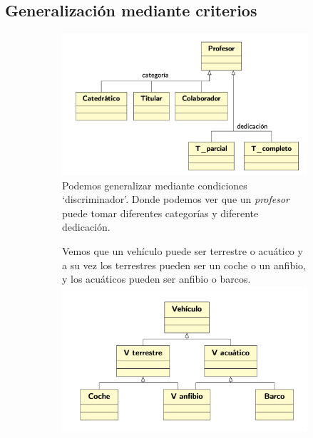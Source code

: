 \subsection{Generalización mediante criterios}
\begin{figure}[h]
	\begin{center}
		\begin{subfigure}[b]{0.45\textwidth} %
			\includegraphics[width=\textwidth]{Imagenes/gen2.png} %
			Podemos generalizar mediante condiciones ‘discriminador’.
			Donde podemos ver que un \textit{profesor} puede tomar diferentes categorías y diferente dedicación.
		\end{subfigure}
		\begin{subfigure}[b]{0.45\textwidth} %

		Vemos que un vehículo puede ser terrestre o acuático y a su vez los terrestres pueden ser un coche o un anfibio, y los acuáticos pueden ser anfibio o barcos.
			\includegraphics[width=\textwidth]{Imagenes/gen3.png}
		\end{subfigure}
	\end{center}
\end{figure}
\newpage
